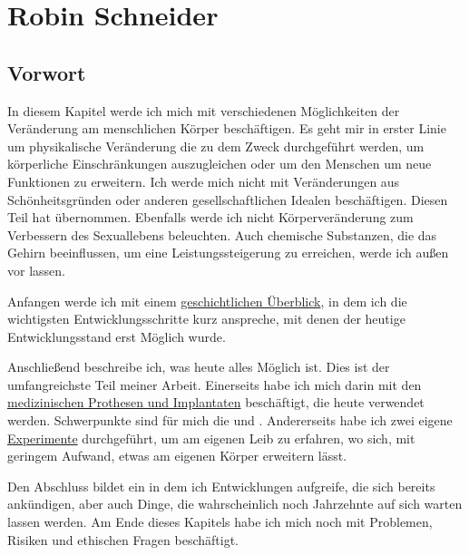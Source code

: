 \chapter{Robin Schneider}
\label{sec:Robin_Schneider}


\section{Vorwort}
In diesem Kapitel werde ich mich mit verschiedenen Möglichkeiten der Veränderung am menschlichen Körper beschäftigen.
Es geht mir in erster Linie um physikalische Veränderung die zu dem Zweck durchgeführt werden,
um körperliche Einschränkungen auszugleichen oder um den Menschen um neue Funktionen zu erweitern.
Ich werde mich nicht mit Veränderungen aus Schönheitsgründen
oder anderen gesellschaftlichen Idealen beschäftigen.
Diesen Teil hat  übernommen.
Ebenfalls werde ich nicht Körperveränderung zum Verbessern des Sexuallebens beleuchten.
Auch chemische Substanzen, die das Gehirn beeinflussen,
um eine Leistungssteigerung zu erreichen, werde ich außen vor lassen.


\bigskip
Anfangen werde ich mit einem \hyperref[sec:Robin:historical_overview]{geschichtlichen Überblick},
in dem ich die wichtigsten Entwicklungsschritte kurz anspreche, mit denen der heutige
Entwicklungsstand erst Möglich wurde.

Anschließend beschreibe ich, was heute alles Möglich ist.
Dies ist der umfangreichste Teil meiner Arbeit. Einerseits habe ich mich darin mit den
\hyperref[sec:Robin:topical]{medizinischen Prothesen und Implantaten} beschäftigt, die heute
verwendet werden. Schwerpunkte sind für mich die
 und .
Andererseits habe ich zwei eigene \hyperref[sec:Robin:experiments]{Experimente} durchgeführt, um am
eigenen Leib zu erfahren, wo sich, mit geringem Aufwand, etwas am eigenen Körper erweitern lässt.

Den Abschluss bildet ein  in dem ich Entwicklungen aufgreife, die sich
bereits ankündigen, aber auch Dinge, die wahrscheinlich noch Jahrzehnte auf sich warten lassen
werden. Am Ende dieses Kapitels habe ich mich noch mit Problemen, Risiken und ethischen
Fragen beschäftigt.









\nocite{
	Spektrum:Weg_zu_intelligenten_Prothesen,
	thesis:Cyborg,
	Stern:pacemaker,
	Heise:Telepolis:Mensch:Cyborg,
}



\printbibliography[heading=source,keyword=Robin]
